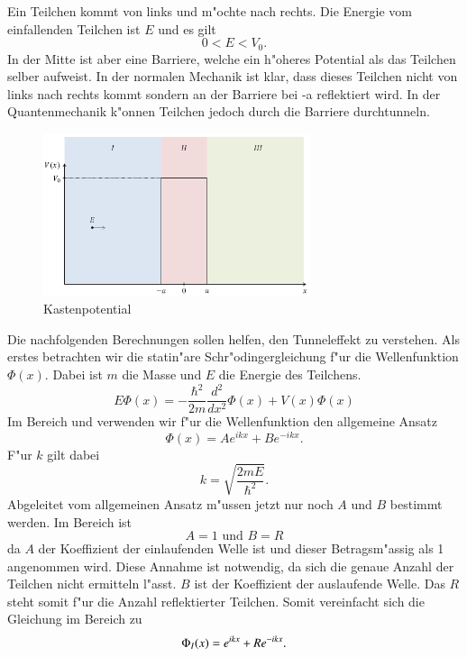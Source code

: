 \begin{refsection}
Ein Teilchen kommt von links und m"ochte nach rechts. Die Energie vom einfallenden Teilchen ist $E$ und es gilt
\[
0 < E < V_0.
\]
In der Mitte ist aber eine Barriere, welche ein h"oheres Potential als das Teilchen selber aufweist. In der normalen Mechanik ist klar, dass dieses Teilchen nicht von links nach rechts kommt sondern an der Barriere bei -a reflektiert wird. In der Quantenmechanik k"onnen Teilchen jedoch durch die Barriere durchtunneln.

\begin{figure}[h]	%
\centering
\includegraphics[width=0.7\textwidth]{tunneldiode/images/Kastenpotential.png}
\caption{Kastenpotential
\label{skript:Kastenpotential}}
\end{figure}

Die nachfolgenden Berechnungen sollen helfen, den Tunneleffekt zu verstehen.  Als erstes betrachten wir die statin"are Schr"odingergleichung f"ur die Wellenfunktion $\Phi(x)$. Dabei ist $m$ die Masse und $E$ die Energie des Teilchens.
\[
E\Phi(x) = -\frac{\hbar^2}{2m}\frac{d^2}{dx^2}\Phi(x) + V(x)\Phi(x)
\]
Im Bereich  und  verwenden wir f"ur die Wellenfunktion den allgemeine Ansatz
\[
\Phi(x) = Ae^{ikx}+Be^{-ikx}.
\]
F"ur $k$ gilt dabei
\[
k = \sqrt{\frac{2mE}{\hbar^2}}.
\]
Abgeleitet vom allgemeinen Ansatz m"ussen jetzt nur noch $A$ und $B$ bestimmt werden. Im Bereich  ist
\[
A = 1 \text{ und } B = R
\]
da $A$ der Koeffizient der einlaufenden Welle ist und dieser Betragsm"assig als 1 angenommen wird. Diese Annahme ist notwendig, da sich die genaue Anzahl der Teilchen nicht ermitteln l"asst. $B$ ist der Koeffizient der auslaufende Welle. Das $R$ steht somit f"ur die Anzahl reflektierter Teilchen. Somit vereinfacht sich die Gleichung im Bereich  zu
\[
\Phi_\RM{1}(x) = e^{ikx} + Re^{-ikx}.
\]


\end{refsection}
